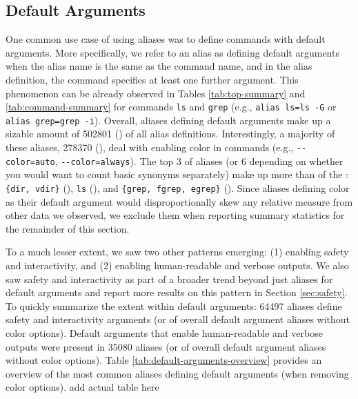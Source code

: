 \subsection{Default Arguments}

One common use case of using aliases was to define commands with default arguments.
More specifically, we refer to an alias as defining default arguments when the alias name is the same as the command name, and in the alias definition, the command specifies at least one further argument.
This phenomenon can be already observed in Tables \ref{tab:top-summary} and \ref{tab:command-summary} for commands \verb|ls| and \verb|grep| (e.g., \verb|alias ls=ls -G| or \verb|alias grep=grep -i|).
Overall, aliases defining default arguments make up a sizable amount of \num{502801} () of all alias definitions. 
Interestingly, a majority of these aliases, \num{278370} (), deal with enabling color in commands (e.g., \verb|--color=auto|, \verb|--color=always|).
The top 3 of aliases (or 6 depending on whether you would want to count basic synonyms separately) make up more than  of the : \verb|{dir, vdir}| (), \verb|ls| (), and \verb|{grep, fgrep, egrep}| ().
Since aliases defining color as their default argument would disproportionally skew any relative measure from other data we observed, we exclude them when reporting summary statistics for the remainder of this section.

To a much lesser extent, we saw two other patterns emerging: (1) enabling safety and interactivity, and (2) enabling human-readable and verbose outputs.
We also saw safety and interactivity as part of a broader trend beyond just aliases for default arguments and report more results on this pattern in Section \ref{sec:safety}.
To quickly summarize the extent within default arguments: \num{64497} aliases define safety and interactivity arguments (or  of overall default argument aliases without color options).
Default arguments that enable human-readable and verbose outputs were present in \num{35080} aliases (or  of overall default argument aliases without color options).
Table \ref{tab:default-arguments-overview} provides an overview of the most common aliases defining default arguments (when removing color options).
\TODO add actual table here

